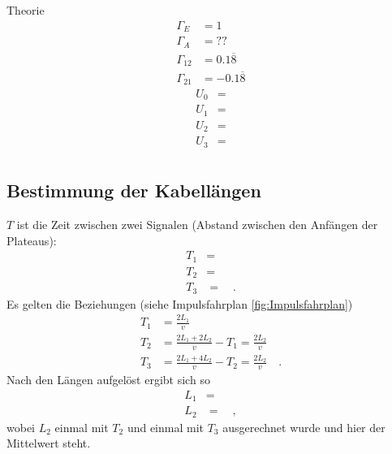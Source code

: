 Theorie
\begin{align}
	\Gamma_E &= 1 \\
	\Gamma_A &= ?? \\
	\Gamma_{12} &= 0.1\overline{8} \\
	\Gamma_{21} &= -0.1\overline{8}
\end{align}
%	
\begin{align}
	U_0 &=  \\
	U_1 &=  \\
	U_2 &=  \\
	U_3 &=  \\
\end{align}
\subsection{Bestimmung der Kabellängen}
$T$ ist die Zeit zwischen zwei Signalen (Abstand zwischen den Anfängen der Plateaus):
\begin{align}
	T_1 &=  \\
	T_2 &=  \\
	T_3 &=  \quad.
\end{align}
Es gelten die Beziehungen (siehe Impulsfahrplan \ref{fig:Impulsfahrplan})
\begin{align}
	T_1 &= \frac{2L_1}{v} \\
	T_2 &= \frac{2L_1 + 2L_2}{v}-T_1 = \frac{2L_2}{v} \\
	T_3 &= \frac{2L_1+4L_2}{v}-T_2 = \frac{2L_2}{v} \quad.
\end{align}
Nach den Längen aufgelöst ergibt sich so
\begin{align}
	L_1 &=  \\
	L_2 &=  \quad, 
\end{align}
wobei $L_2$ einmal mit $T_2$ und einmal mit $T_3$ ausgerechnet wurde und hier der Mittelwert steht.